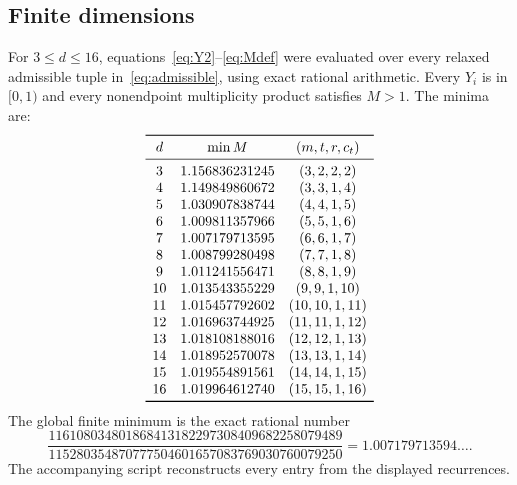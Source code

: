 \documentclass[11pt]{amsart}
\theoremstyle{definition}
\begin{document}
\subsection{Finite dimensions}
For $3\le d\le16$, equations~\eqref{eq:Y2}--\eqref{eq:Mdef} were evaluated over every relaxed admissible tuple in~\eqref{eq:admissible}, using exact rational arithmetic.  Every $Y_i$ is in $[0,1)$ and every nonendpoint multiplicity product satisfies $M>1$.  The minima are:
\[
\begin{array}{c@{\quad}c@{\quad}c}
\toprule
 d&\min M&(m,t,r,c_t)\\
\midrule
3&1.156836231245&(3,2,2,2)\\
4&1.149849860672&(3,3,1,4)\\
5&1.030907838744&(4,4,1,5)\\
6&1.009811357966&(5,5,1,6)\\
7&1.007179713595&(6,6,1,7)\\
8&1.008799280498&(7,7,1,8)\\
9&1.011241556471&(8,8,1,9)\\
10&1.013543355229&(9,9,1,10)\\
11&1.015457792602&(10,10,1,11)\\
12&1.016963744925&(11,11,1,12)\\
13&1.018108188016&(12,12,1,13)\\
14&1.018952570078&(13,13,1,14)\\
15&1.019554891561&(14,14,1,15)\\
16&1.019964612740&(15,15,1,16)\\
\bottomrule
\end{array}
\]
The global finite minimum is the exact rational number
\begin{equation}\label{eq:worstM}
 \frac{116108034801868413182297308409682258079489}
 {115280354870777504601657083769030760079250}
 =1.007179713594\ldots.
\end{equation}
The accompanying script reconstructs every entry from the displayed recurrences.
\end{document}
